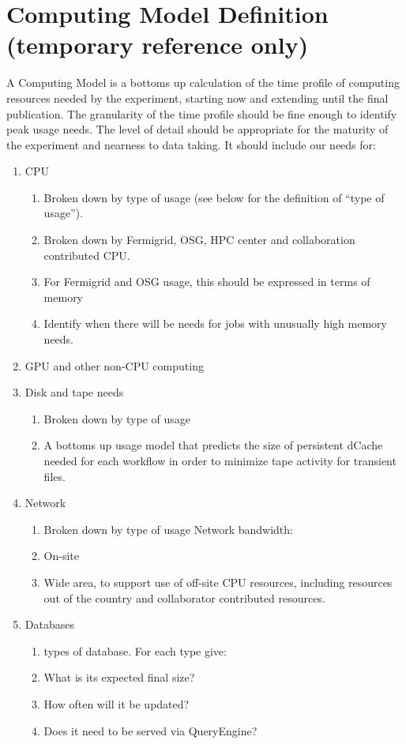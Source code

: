 \section{Computing Model Definition (temporary reference only)}
A Computing Model is a bottoms up calculation of the time profile of computing resources needed by the experiment, starting now and extending until the final publication. The granularity of the time profile should be fine enough to identify peak usage needs. The level of detail should be appropriate for the maturity of the experiment and nearness to data taking.
It should include our needs for:
\begin{enumerate}
  \item CPU
    \begin{enumerate}
      \item Broken down by type of usage (see below for the definition of “type of usage”).
      \item Broken down by Fermigrid, OSG, HPC center and collaboration contributed CPU.
      \item For Fermigrid and OSG usage, this should be expressed in terms of memory
      \item Identify when there will be needs for jobs with unusually high memory needs.
    \end{enumerate}

  \item GPU and other non-CPU computing
  \item Disk and tape needs
    \begin{enumerate}
      \item Broken down by type of usage
      \item A bottoms up usage model that predicts the size of persistent dCache needed for
        each workflow in order to minimize tape activity for transient files.
    \end{enumerate}
  \item Network
    \begin{enumerate}
      \item Broken down by type of usage Network bandwidth:
      \item On-site
      \item Wide area, to support use of off-site CPU resources, including resources out of
        the country and collaborator contributed resources.
    \end{enumerate}

  \item  Databases
    \begin{enumerate}
      \item types of database.  For each type give:
      \item What is its expected final size?
      \item How often will it be updated?
      \item Does it need to be served via QueryEngine?
    \end{enumerate}
\end{enumerate}
